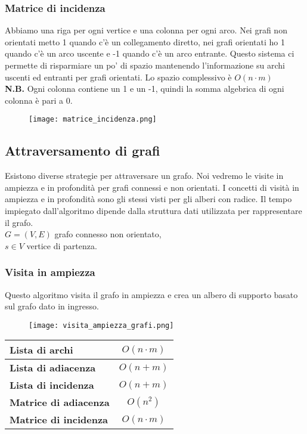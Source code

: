 \subsubsection{Matrice di incidenza}
Abbiamo una riga per ogni vertice e una colonna per ogni arco. Nei grafi non orientati metto 1 quando c'è un 
collegamento diretto, nei grafi orientati ho 1 quando c'è un arco uscente e -1 quando
c'è un arco entrante.
Questo sistema ci permette di risparmiare un po' di spazio mantenendo l'informazione
su archi uscenti ed entranti per grafi orientati.
Lo spazio complessivo è $O(n \cdot m)$\\
\textbf{N.B.} Ogni colonna contiene un 1 e un -1, quindi la somma algebrica di ogni colonna è pari a 0.
\begin{figure}[h]
    \texttt{[image: matrice\_incidenza.png]}
\end{figure}
\clearpage


\subsection{Attraversamento di grafi}
Esistono diverse strategie per attraversare un grafo. Noi vedremo le visite in 
ampiezza e in profondità per grafi connessi e non orientati. I concetti di visità in ampiezza 
e in profondità sono gli stessi visti per gli alberi con radice.
Il tempo impiegato dall'algoritmo dipende dalla struttura dati utilizzata per rappresentare il grafo.\\

\noindent $G = (V,E)$ grafo connesso non orientato,\\
$s \in V$ vertice di partenza.
\subsubsection{Visita in ampiezza}
Questo algoritmo visita il grafo in ampiezza e crea un albero di supporto basato sul grafo 
dato in ingresso.\\
\begin{figure}[h]
    \texttt{[image: visita\_ampiezza\_grafi.png]}
\end{figure}

\begin{tabular}{|l|c|}
    \hline
    \textbf{Lista di archi} & $O(n \cdot m)$ \\
    \hline
    \textbf{Lista di adiacenza} & $O(n + m)$ \\
    \hline
    \textbf{Lista di incidenza} & $O(n + m)$ \\
    \hline
    \textbf{Matrice di adiacenza} & $O(n^2)$ \\
    \hline
    \textbf{Matrice di incidenza} & $O(n \cdot m)$ \\
    \hline
\end{tabular}
\clearpage

